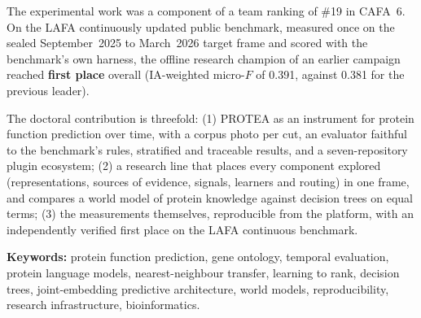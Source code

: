 The experimental work was a component of a team ranking of \#19 in CAFA~6. On the LAFA
continuously updated public benchmark, measured once on the sealed September~2025 to
March~2026 target frame and scored with the benchmark's own harness, the offline
research champion of an earlier campaign reached \textbf{first place} overall
(IA-weighted micro-$F$ of 0.391, against 0.381 for the previous leader).

The doctoral contribution is threefold: (1) PROTEA as an instrument for protein
function prediction over time, with a corpus photo per cut, an evaluator faithful to
the benchmark's rules, stratified and traceable results, and a seven-repository plugin
ecosystem; (2) a research line that places every component explored (representations,
sources of evidence, signals, learners and routing) in one frame, and compares a world
model of protein knowledge against decision trees on equal terms; (3) the measurements
themselves, reproducible from the platform, with an independently verified first place
on the LAFA continuous benchmark.

\bigskip
\noindent\textbf{Keywords:} protein function prediction, gene ontology, temporal
evaluation, protein language models, nearest-neighbour transfer, learning to rank,
decision trees, joint-embedding predictive architecture, world models, reproducibility,
research infrastructure, bioinformatics.
